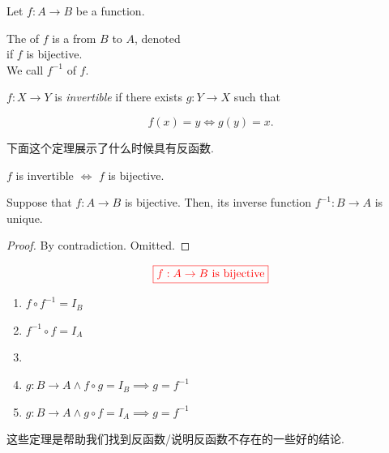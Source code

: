 \begin{definition}
  Let $f: A \to B$ be a function. 

  The  of $f$ is a 
  from $B$ to $A$, denoted  \\
  if $f$ is bijective. \\

  We call $f^{-1}$   of $f$.
\end{definition}


\begin{definition}[Invertible]
      $f: X \to Y$ is {\it invertible} if there exists $g: Y \to X$ such that
  
      \[
        f(x) = y \iff g(y) = x.
      \]
\end{definition}

下面这个定理展示了什么时候具有反函数. 
\begin{theorem}
  $f$ is invertible $\iff$ $f$ is bijective.
\end{theorem}

\begin{theorem}
  Suppose that $f: A \to B$ is bijective.
  Then, its inverse function $f^{-1}: B \to A$ is unique.
\end{theorem}

\begin{proof}
  By contradiction. Omitted.
\end{proof}

\begin{theorem}[]
  \[
    \textcolor{red}{\boxed{f: A \to B \text{ is bijective}}}
  \]

  \begin{enumerate}
    \item $f \circ f^{-1} = I_B$
    \item $f^{-1} \circ f = I_A$
    \vspace{0.30cm}
    \item {}
    \vspace{0.30cm}
    \item $g: B \to A \land f \circ g = I_B \implies g = f^{-1}$
    \item $g: B \to A \land g \circ f = I_A \implies g = f^{-1}$
  \end{enumerate}
\end{theorem}

这些定理是帮助我们找到反函数/说明反函数不存在的一些好的结论.

